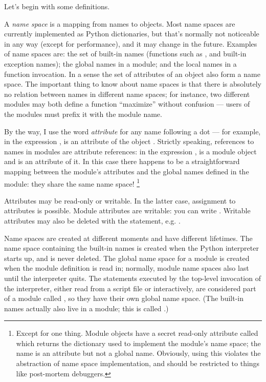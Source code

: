 \documentclass{manual}
\begin{document}
Let's begin with some definitions.

A \emph{name space} is a mapping from names to objects.  Most name
spaces are currently implemented as Python dictionaries, but that's
normally not noticeable in any way (except for performance), and it
may change in the future.  Examples of name spaces are: the set of
built-in names (functions such as , and built-in exception
names); the global names in a module; and the local names in a
function invocation.  In a sense the set of attributes of an object
also form a name space.  The important thing to know about name
spaces is that there is absolutely no relation between names in
different name spaces; for instance, two different modules may both
define a function ``maximize'' without confusion --- users of the
modules must prefix it with the module name.

By the way, I use the word \emph{attribute} for any name following a
dot --- for example, in the expression ,  is
an attribute of the object .  Strictly speaking, references to
names in modules are attribute references: in the expression
,  is a module object and
 is an attribute of it.  In this case there happens to
be a straightforward mapping between the module's attributes and the
global names defined in the module: they share the same name space!%
\footnote{
        Except for one thing.  Module objects have a secret read-only
        attribute called  which returns the dictionary
        used to implement the module's name space; the name
         is an attribute but not a global name.
        Obviously, using this violates the abstraction of name space
        implementation, and should be restricted to things like
        post-mortem debuggers.
}

Attributes may be read-only or writable.  In the latter case,
assignment to attributes is possible.  Module attributes are writable:
you can write .  Writable attributes may
also be deleted with the  statement, e.g.
.

Name spaces are created at different moments and have different
lifetimes.  The name space containing the built-in names is created
when the Python interpreter starts up, and is never deleted.  The
global name space for a module is created when the module definition
is read in; normally, module name spaces also last until the
interpreter quits.  The statements executed by the top-level
invocation of the interpreter, either read from a script file or
interactively, are considered part of a module called
, so they have their own global name space.  (The
built-in names actually also live in a module; this is called
.)
\end{document}
